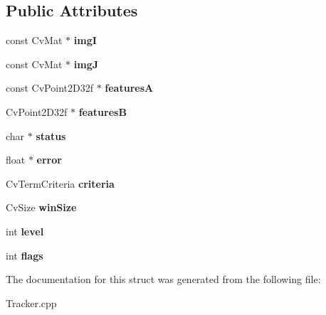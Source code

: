 \subsection*{\-Public \-Attributes}
\begin{DoxyCompactItemize}
\item 
\hypertarget{structcv_1_1_l_k_tracker_invoker_ad25a2108bfb7a399153a24bb5d8a07b2}{const \-Cv\-Mat $\ast$ {\bfseries img\-I}}\label{structcv_1_1_l_k_tracker_invoker_ad25a2108bfb7a399153a24bb5d8a07b2}

\item 
\hypertarget{structcv_1_1_l_k_tracker_invoker_ab70799ec7fde89106449a4b3a3ccb52d}{const \-Cv\-Mat $\ast$ {\bfseries img\-J}}\label{structcv_1_1_l_k_tracker_invoker_ab70799ec7fde89106449a4b3a3ccb52d}

\item 
\hypertarget{structcv_1_1_l_k_tracker_invoker_a3ad5250258e7629964061aceb657c627}{const \-Cv\-Point2\-D32f $\ast$ {\bfseries features\-A}}\label{structcv_1_1_l_k_tracker_invoker_a3ad5250258e7629964061aceb657c627}

\item 
\hypertarget{structcv_1_1_l_k_tracker_invoker_a1c8f338c54b0be46c48502bd8bccf70f}{\-Cv\-Point2\-D32f $\ast$ {\bfseries features\-B}}\label{structcv_1_1_l_k_tracker_invoker_a1c8f338c54b0be46c48502bd8bccf70f}

\item 
\hypertarget{structcv_1_1_l_k_tracker_invoker_acc84b945e00de9024cc288e736e0fe4b}{char $\ast$ {\bfseries status}}\label{structcv_1_1_l_k_tracker_invoker_acc84b945e00de9024cc288e736e0fe4b}

\item 
\hypertarget{structcv_1_1_l_k_tracker_invoker_a2206a4f5f9a7153272b6951d7ee3c47d}{float $\ast$ {\bfseries error}}\label{structcv_1_1_l_k_tracker_invoker_a2206a4f5f9a7153272b6951d7ee3c47d}

\item 
\hypertarget{structcv_1_1_l_k_tracker_invoker_ad0d5964c26864a53a0c3dfa5136ce1ee}{\-Cv\-Term\-Criteria {\bfseries criteria}}\label{structcv_1_1_l_k_tracker_invoker_ad0d5964c26864a53a0c3dfa5136ce1ee}

\item 
\hypertarget{structcv_1_1_l_k_tracker_invoker_a14ca5276756df79e50626f9221379251}{\-Cv\-Size {\bfseries win\-Size}}\label{structcv_1_1_l_k_tracker_invoker_a14ca5276756df79e50626f9221379251}

\item 
\hypertarget{structcv_1_1_l_k_tracker_invoker_a13be3f8f6e9a3f4118b8b5d8123e6da2}{int {\bfseries level}}\label{structcv_1_1_l_k_tracker_invoker_a13be3f8f6e9a3f4118b8b5d8123e6da2}

\item 
\hypertarget{structcv_1_1_l_k_tracker_invoker_a0cb4179377610fc4ed4f169690dd69f8}{int {\bfseries flags}}\label{structcv_1_1_l_k_tracker_invoker_a0cb4179377610fc4ed4f169690dd69f8}

\end{DoxyCompactItemize}


\-The documentation for this struct was generated from the following file\-:\begin{DoxyCompactItemize}
\item 
\-Tracker.\-cpp\end{DoxyCompactItemize}
